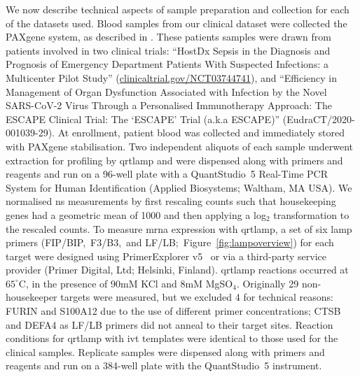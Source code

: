 \documentclass[../thesis.tex]{subfiles}
\begin{document}
We now describe technical aspects of sample preparation and collection for each of the datasets used. Blood samples from our clinical dataset were collected the PAXgene  system, as described in \citet{ram-mohan_using_2022}. These patients samples were drawn from patients involved in two clinical trials: ``HostDx Sepsis in the Diagnosis and Prognosis of Emergency Department Patients With Suspected Infections: a Multicenter Pilot Study'' (\url{clinicaltrial.gov/NCT03744741}), and ``Efficiency in Management of Organ Dysfunction Associated with Infection by the Novel SARS-CoV-2 Virus Through a Personalised Immunotherapy Approach: The ESCAPE Clinical Trial: The `ESCAPE' Trial (a.k.a ESCAPE)'' (EudraCT/2020-001039-29). At enrollment, patient blood was collected and immediately stored with PAXgene  stabilisation. Two independent aliquots of each sample underwent  extraction for profiling by \gls{qrtlamp} and were dispensed along with primers and reagents and run on a 96-well plate with a QuantStudio\texttrademark~5 Real-Time PCR System for Human Identification (Applied Biosystems; Waltham, MA USA).  We normalised \gls{ns} measurements by first rescaling counts such that housekeeping genes had a geometric mean of 1000 and then applying a \textsf{log}$_{2}$ transformation to the rescaled counts. To measure \gls{mrna} expression with \gls{qrtlamp}, a set of six \gls{lamp} primers (FIP/BIP,~F3/B3,~and  LF/LB;~Figure~\ref{fig:lampoverview}) for each target were designed using PrimerExplorer v5~\citep{eiken_primerexplorer_2019} or via a third-party service provider (Primer Digital, Ltd; Helsinki, Finland). \Gls{qrtlamp} reactions occurred at $65^{\circ}$C, in the presence of 90mM KCl and 8mM MgSO$_4$. Originally 29 non-housekeeper targets were measured, but we excluded 4 for technical reasons: {FURIN} and {S100A12} due to the use of different primer concentrations; {CTSB} and {DEFA4} as LF/LB primers did not anneal to their target sites. Reaction conditions for \gls{qrtlamp} with \gls{ivt}  templates were identical to those used for the clinical samples. Replicate samples were dispensed along with primers and reagents and run on a 384-well plate with the QuantStudio\texttrademark~5 instrument. 

\end{document}
